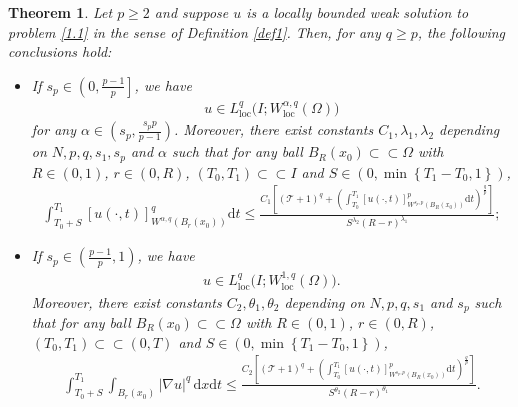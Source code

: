 \documentclass[reqno,10pt]{amsart}
\numberwithin{equation}{section}
\newtheorem{theorem}{Theorem}[section]
\begin{document}
\begin{theorem}
	\label{th14}
	Let $p\ge2$ and suppose $u$ is a locally bounded weak solution to problem \eqref{1.1} in the sense of Definition \ref{def1}. Then, for any $q\ge p$, the following conclusions hold:
	\begin{itemize}
		\item[(i)] If $s_p\in \left( 0,\frac{p-1}{p}\right]$, we have
		\begin{align*}
			u\in L^q_{\mathrm{loc}}\bigl(I;W^{\alpha,q}_{\mathrm{loc}}(\Omega)\bigl)
		\end{align*}
		for any $\alpha\in\left(s_p,\frac{s_pp}{p-1}\right)$. Moreover, there exist constants $C_1,\lambda_1,\lambda_2$ depending on $N,p,q,s_1,s_p$ and $\alpha$ such that for any ball $B_R(x_0)\subset\subset\Omega$ with $R\in(0,1)$, $r\in (0,R)$, $(T_0,T_1)\subset\subset I$ and $S\in \left( 0,\min\left\lbrace T_1-T_0,1\right\rbrace \right) $,
		\begin{align*}
			\int_{T_0+S}^{T_1}[u(\cdot,t)]^q_{W^{\alpha,q}\left( B_r(x_0)\right) }\mathrm{d}t\le\frac{C_1\left[\left(\mathcal{T}+1\right)^q+\left( \int_{T_0}^{T_1}[u(\cdot,t)]^p_{W^{s_p,p}\left( B_R(x_0)\right)}\mathrm{d}t\right)^{\frac{q}{p}} \right]}{S^{\lambda_2}(R-r)^{\lambda_1}};
		\end{align*}
		\item[(ii)] If $s_p\in \left( \frac{p-1}{p},1\right)$, we have
		\begin{align*}
			u\in L^q_{\mathrm{loc}}\bigl(I;W^{1,q}_{\mathrm{loc}}(\Omega)\bigl).
		\end{align*}
		Moreover, there exist constants $C_2,\theta_1,\theta_2$ depending on $N,p,q,s_1$ and $s_p$ such that for any ball $B_R(x_0)\subset\subset\Omega$ with $R\in(0,1)$, $r\in (0,R)$, $(T_0,T_1)\subset\subset(0,T)$ and $S\in \left( 0,\min\left\lbrace T_1-T_0,1\right\rbrace \right) $,
		\begin{align*}
			\int_{T_0+S}^{T_1}\int_{B_r(x_0)}|\nabla u|^q\,\mathrm{d}x\mathrm{d}t\le\frac{C_2\left[\left(\mathcal{T}+1\right)^q+\left( \int_{T_0}^{T_1}[u(\cdot,t)]^p_{W^{s_p,p}\left( B_R(x_0)\right)}\mathrm{d}t\right)^{\frac{q}{p}} \right]}{S^{\theta_2}(R-r)^{\theta_1}}.
		\end{align*}
	\end{itemize}
\end{theorem}
\end{document}
